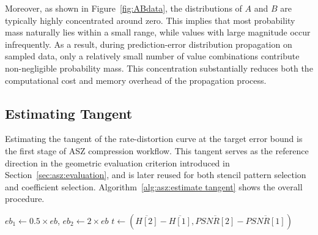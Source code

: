 Moreover, as shown in Figure~\ref{fig:ABdata}, the distributions of $A$ and $B$ are typically highly concentrated around zero. This implies that most probability mass naturally lies within a small range, while values with large magnitude occur infrequently. As a result, during prediction-error distribution propagation on sampled data, only a relatively small number of value combinations contribute non-negligible probability mass. This concentration substantially reduces both the computational cost and memory overhead of the propagation process.

\subsection{Estimating Tangent}\label{sec:asz:estimate tangent}




Estimating the tangent of the rate-distortion curve at the target error bound is the first stage of ASZ compression workflow.
This tangent serves as the reference direction in the geometric evaluation criterion introduced in Section~\ref{sec:asz:evaluation}, and is later reused for both stencil pattern selection and coefficient selection.
Algorithm~\ref{alg:asz:estimate tangent} shows the overall procedure.

\begin{algorithm}[h]
\small
\caption{Estimate Tangent}
\label{alg:asz:estimate tangent}
$eb_1 \leftarrow 0.5 \times eb$, $eb_2 \leftarrow 2 \times eb$\;
$t \leftarrow \left(\overline{H[2]}-\overline{H[1]},\overline{\mathit{PSNR}[2]}-\overline{\mathit{PSNR}[1]}\right)$\;
\;
\end{algorithm}


